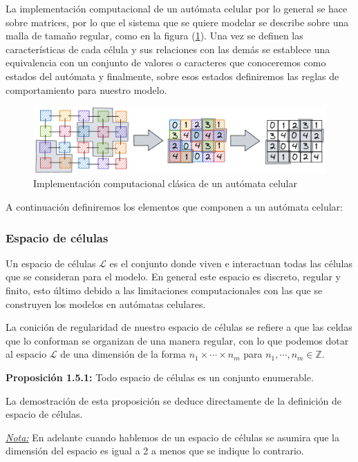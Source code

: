 La implementación computacional de un autómata celular por lo general se hace sobre matrices, por lo que el sistema que se quiere modelar se describe sobre una malla de tamaño regular, como en la figura (\ref{fig:AC a matriz}). Una vez se definen las características de cada célula y sus relaciones con las demás se establece una equivalencia con un conjunto de valores o caracteres que conoceremos como estados del autómata y finalmente, sobre esos estados definiremos las reglas de comportamiento para nuestro modelo.

\begin{figure}[h]
  \centering
    \includegraphics[width=1\textwidth]{Imagenes/ACaMatriz.PNG}
  \caption{Implementación computacional clásica de un autómata celular}
  \label{fig:AC a matriz}
\end{figure}

A continuación definiremos los elementos que componen a un autómata celular:

\subsubsection{Espacio de células}

Un espacio de células $\mathcal{L}$ es el conjunto donde viven e interactuan todas las células que se consideran para el modelo. En general este espacio es discreto, regular y finito, esto último debido a las limitaciones computacionales con las que se construyen los modelos en autómatas celulares.

La conición de regularidad de nuestro espacio de células se refiere a que las celdas que lo conforman se organizan de una manera regular, con lo que podemos dotar al espacio $\mathcal{L}$ de una dimensión de la forma $n_1\times\cdots\times n_m$ para $n_1,\cdots,n_m\in\mathbb{Z}$.

\textbf{Proposición 1.5.1:} Todo espacio de células es un conjunto enumerable.

La demostración de esta proposición se deduce directamente de la definición de espacio de células.

\underline{\textit{Nota:}} En adelante cuando hablemos de un espacio de células se asumira que la dimensión del espacio es igual a 2 a menos que se indique lo contrario.

